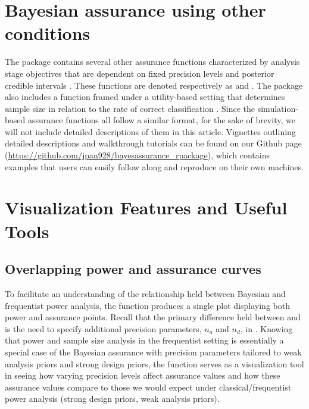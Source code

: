 \section{Bayesian assurance using other conditions}
\label{sec:othermethods}

The   package contains several other 
assurance functions characterized by analysis stage 
objectives that are dependent on fixed 
precision levels \citep{cj} and posterior credible intervals 
\citep{pham}. These functions are denoted respectively as 
 and .
The package also includes a  function 
framed under a utility-based setting \citep[see, e.g.,][]{raiffa, berger, lindley, parm, parmigiani, inoue}
that determines sample size in relation to the rate of correct 
classification \citep{inoue}. 
Since the simulation-based assurance functions all follow a similar format,
for the sake of brevity, we will not include detailed descriptions
of them in this article. Vignettes outlining detailed 
descriptions and walkthrough
tutorials can be found on our Github 
page (\href{https://github.com/jpan928/bayesassurance_rpackage}{https://github.com/jpan928/bayesassurance\_rpackage}), which contains examples that users can easily follow along 
and reproduce on their own machines. 




\section[Visualization features and useful tools]{Visualization Features and Useful Tools} \label{sec:tools}

\subsection{Overlapping power and assurance curves}

To facilitate an understanding of the relationship held between
Bayesian and frequentist power analysis, the  function 
produces a single plot displaying both power and assurance points. 
Recall that the primary difference held between
 and 
is the need to specify additional precision parameters, 
$n_a$ and $n_d$, in . 
Knowing that power and sample size analysis in the frequentist setting
is essentially a special case of the Bayesian assurance 
with precision parameters tailored to weak analysis priors
and strong design priors, the  function
serves as a visualization tool in seeing how varying precision levels
affect assurance values and how these assurance values 
compare to those we would expect under classical/frequentist
power analysis (strong design priors, weak analysis priors). 

